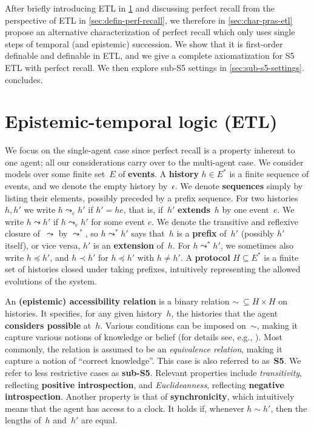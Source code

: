 \documentclass{article}
\def\dfn{\textbf}
\newcommand{\acc}{\sim}
\newcounter{#1}
\begin{document}
\medskip

After briefly introducing ETL in \cref{sec:epist-temp-logic}
and discussing perfect recall from the perspective of ETL in \cref{sec:defin-perf-recall},
we therefore in \cref{sec:char-pras-etl} propose an alternative characterization of perfect recall
which only uses single steps of temporal (and epistemic) succession.
We show that it is first-order definable and definable in ETL,
and we give a complete axiomatization for S5 ETL with perfect recall.
We then explore sub-S5 settings in \cref{sec:sub-s5-settings}.
 concludes.


\section{Epistemic-temporal logic (ETL)}
\label{sec:epist-temp-logic}

We focus on the single-agent case since perfect recall is a property inherent to one agent;
all our considerations carry over to the multi-agent case.
We consider models over some finite set~$E$ of \dfn{events}.
A \dfn{history} $h\in E^*$ is a finite sequence of events,
and we denote the empty history by~$\epsilon$.
We denote \dfn{sequences} simply by listing their elements,
possibly preceded by a prefix sequence.
For two histories $h,h'$ we write $h\leadsto_eh'$ if $h'=he$,
that is, if~$h'$ \dfn{extends}~$h$ by one event~$e$.
We write $h\leadsto h'$ if $h\leadsto_eh'$ for some event $e$.
We denote the transitive and reflexive closure of~$\leadsto$ by $\leadsto^*$,
so $h\leadsto^*h'$ says that~$h$ is a \dfn{prefix} of~$h'$ (possibly $h'$ itself),
or vice versa, $h'$ is an \dfn{extension} of~$h$.
For $h\leadsto^*h'$, we sometimes also write $h\preceq h'$,
and $h\prec h'$ for $h\preceq h'$ with $h\neq h'$.
A \dfn{protocol} $H\subseteq E^*$ is a finite set of histories closed under taking prefixes,
intuitively representing the allowed evolutions of the system.

An \dfn{(epistemic) accessibility relation} is a binary relation $\acc\ \subseteq H\times H$ on histories.
It specifies, for any given history~$h$,
the histories that the agent \dfn{considers possible} at~$h$.
Various conditions can be imposed on~$\acc$,
making it capture various notions of knowledge or belief
(for details see, e.g., \cite{chellas_modal_1980}).
Most commonly, the relation is assumed to be an \emph{equivalence relation},
making it capture a notion of ``correct knowledge''.
This case is also referred to as~\dfn{S5}.
We refer to less restrictive cases as \dfn{sub-S5}.
Relevant properties include \emph{transitivity},
reflecting \dfn{positive introspection},
and \emph{Euclideanness},
reflecting \dfn{negative introspection}.
Another property is that of \dfn{synchronicity},
which intuitively means that the agent has access to a clock.
It holds if, whenever $h\acc h'$, then the lengths of~$h$ and~$h'$ are equal.
\end{document}

